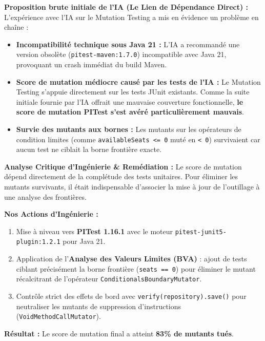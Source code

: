 \documentclass[11pt, a4paper, openany]{report}
\begin{document}
\begin{aiCritiqueBox}
\textbf{Proposition brute initiale de l'IA (Le Lien de Dépendance Direct) :}
L'expérience avec l'IA sur le Mutation Testing a mis en évidence un problème en chaîne :
\begin{itemize}[label=$\times$, itemsep=1pt]
    \item \textbf{Incompatibilité technique sous Java 21 :} L'IA a recommandé une version obsolète (\texttt{pitest-maven:1.7.0}) incompatible avec Java 21, provoquant un crash immédiat du build Maven.
    \item \textbf{Score de mutation médiocre causé par les tests de l'IA :} Le Mutation Testing s'appuie directement sur les tests JUnit existants. Comme la suite initiale fournie par l'IA offrait une mauvaise couverture fonctionnelle, \textbf{le score de mutation PITest s'est avéré particulièrement mauvais}.
    \item \textbf{Survie des mutants aux bornes :} Les mutants sur les opérateurs de condition limites (comme \texttt{availableSeats <= 0} muté en \texttt{< 0}) survivaient car aucun test ne ciblait la borne frontière exacte.
\end{itemize}
\end{aiCritiqueBox}

\begin{engSolutionBox}
\textbf{Analyse Critique d'Ingénierie \& Remédiation :}
Le score de mutation dépend directement de la complétude des tests unitaires. Pour éliminer les mutants survivants, il était indispensable d'associer la mise à jour de l'outillage à une analyse des frontières.

\textbf{Nos Actions d'Ingénierie :}
\begin{enumerate}[noitemsep]
    \item Mise à niveau vers \textbf{PITest 1.16.1} avec le moteur \texttt{pitest-junit5-plugin:1.2.1} pour Java 21.
    \item Application de l'\textbf{Analyse des Valeurs Limites (BVA)} : ajout de tests ciblant précisément la borne frontière (\texttt{seats == 0}) pour éliminer le mutant récalcitrant de l'opérateur \texttt{ConditionalsBoundaryMutator}.
    \item Contrôle strict des effets de bord avec \texttt{verify(repository).save()} pour neutraliser les mutants de suppression d'instructions (\texttt{VoidMethodCallMutator}).
\end{enumerate}
\textbf{Résultat :} Le score de mutation final a atteint \textbf{83\% de mutants tués}.
\end{engSolutionBox}
\end{document}
